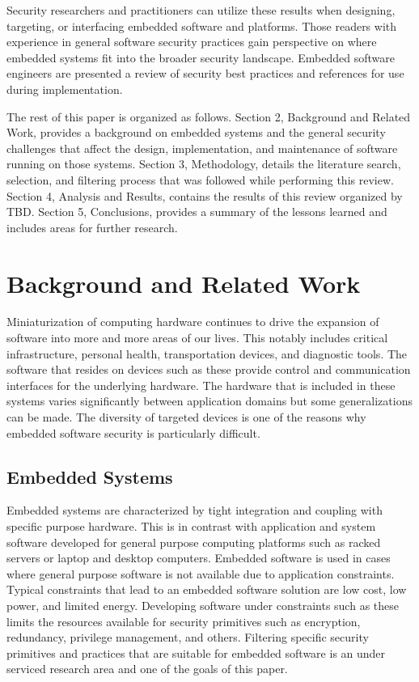 \documentclass[final,conference,10pt]{IEEEtran}
\begin{document}
Security researchers and practitioners can utilize these results when designing, targeting, or interfacing embedded software and platforms.  Those readers with experience in general software security practices gain perspective on where embedded systems fit into the broader security landscape.  Embedded software engineers are presented a review of security best practices and references for use during implementation.

The rest of this paper is organized as follows. Section 2, Background and Related Work, provides a background on embedded systems and the general security challenges that affect the design, implementation, and maintenance of software running on those systems. Section 3, Methodology, details the literature search, selection, and filtering process that was followed while performing this review. Section 4, Analysis and Results, contains the results of this review organized by TBD. Section 5, Conclusions, provides a summary of the lessons learned and includes areas for further research.

\section{Background and Related Work}
Miniaturization of computing hardware continues to drive the expansion of software into more and more areas of our lives.  This notably includes critical infrastructure, personal health, transportation devices, and diagnostic tools.  The software that resides on devices such as these provide control and communication interfaces for the underlying hardware.  The hardware that is included in these systems varies significantly between application domains but some generalizations can be made.  The diversity of targeted devices is one of the reasons why embedded software security is particularly difficult.

\subsection{Embedded Systems}

Embedded systems are characterized by tight integration and coupling with specific purpose hardware.  This is in contrast with application and system software developed for general purpose computing platforms such as racked servers or laptop and desktop computers.  Embedded software is used in cases where general purpose software is not available due to application constraints.  Typical constraints that lead to an embedded software solution are low cost, low power, and limited energy. Developing software under constraints such as these limits the resources available for security primitives such as encryption, redundancy, privilege management, and others.  Filtering specific security primitives and practices that are suitable for embedded software is an under serviced research area and one of the goals of this paper.
\end{document}
